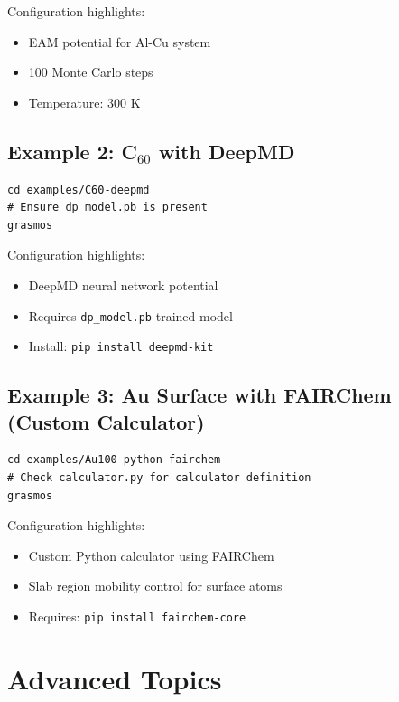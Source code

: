 \documentclass[11pt,a4paper]{article}
\begin{document}
Configuration highlights:
\begin{itemize}
    \item EAM potential for Al-Cu system
    \item 100 Monte Carlo steps
    \item Temperature: 300 K
\end{itemize}

\subsection{Example 2: C$_{60}$ with DeepMD}
\begin{lstlisting}[style=bashStyle]
cd examples/C60-deepmd
# Ensure dp_model.pb is present
grasmos
\end{lstlisting}

Configuration highlights:
\begin{itemize}
    \item DeepMD neural network potential
    \item Requires \texttt{dp\_model.pb} trained model
    \item Install: \texttt{pip install deepmd-kit}
\end{itemize}

\subsection{Example 3: Au Surface with FAIRChem (Custom Calculator)}
\begin{lstlisting}[style=bashStyle]
cd examples/Au100-python-fairchem
# Check calculator.py for calculator definition
grasmos
\end{lstlisting}

Configuration highlights:
\begin{itemize}
    \item Custom Python calculator using FAIRChem
    \item Slab region mobility control for surface atoms
    \item Requires: \texttt{pip install fairchem-core}
\end{itemize}

\section{Advanced Topics}
\end{document}
